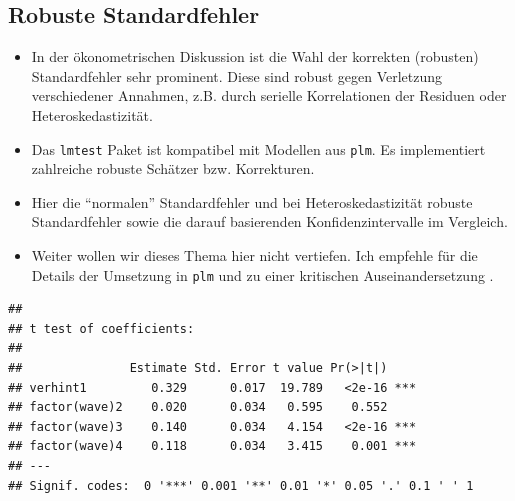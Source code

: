 \documentclass[
]{book}
\newenvironment{Shaded}{\begin{snugshade}}{\end{snugshade}}
\newcommand{\CommentTok}[1]{\textcolor[rgb]{0.56,0.35,0.01}{\textit{#1}}}
\newcommand{\DecValTok}[1]{\textcolor[rgb]{0.00,0.00,0.81}{#1}}
\newcommand{\KeywordTok}[1]{\textcolor[rgb]{0.13,0.29,0.53}{\textbf{#1}}}
\newcommand{\NormalTok}[1]{#1}
\newcommand{\OperatorTok}[1]{\textcolor[rgb]{0.81,0.36,0.00}{\textbf{#1}}}
\newcommand{\StringTok}[1]{\textcolor[rgb]{0.31,0.60,0.02}{#1}}
\begin{document}
\hypertarget{robuste-standardfehler}{%
\subsection*{Robuste Standardfehler}\label{robuste-standardfehler}}

\begin{itemize}
\item
  In der ökonometrischen Diskussion ist die Wahl der korrekten (robusten) Standardfehler sehr prominent. Diese sind robust gegen Verletzung verschiedener Annahmen, z.B. durch serielle Korrelationen der Residuen oder Heteroskedastizität.
\item
  Das \texttt{lmtest} Paket \citep{R-lmtest} ist kompatibel mit Modellen aus \texttt{plm}. Es implementiert zahlreiche robuste Schätzer bzw. Korrekturen.
\item
  Hier die ``normalen'' Standardfehler und bei Heteroskedastizität robuste Standardfehler sowie die darauf basierenden Konfidenzintervalle im Vergleich.
\item
  Weiter wollen wir dieses Thema hier nicht vertiefen. Ich empfehle für die Details der Umsetzung in \texttt{plm} \citet{plm2017} und zu einer kritischen Auseinandersetzung \citet{kingHowRobustStandard2015}.
\end{itemize}

\begin{Shaded}
\end{Shaded}

\begin{verbatim}
## 
## t test of coefficients:
## 
##               Estimate Std. Error t value Pr(>|t|)    
## verhint1         0.329      0.017  19.789   <2e-16 ***
## factor(wave)2    0.020      0.034   0.595    0.552    
## factor(wave)3    0.140      0.034   4.154   <2e-16 ***
## factor(wave)4    0.118      0.034   3.415    0.001 ***
## ---
## Signif. codes:  0 '***' 0.001 '**' 0.01 '*' 0.05 '.' 0.1 ' ' 1
\end{verbatim}

\begin{Shaded}
\end{Shaded}
\end{document}
